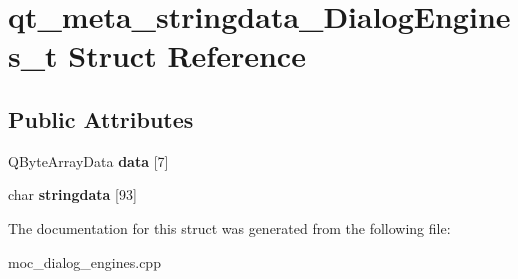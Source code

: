 \hypertarget{structqt__meta__stringdata__DialogEngines__t}{\section{qt\-\_\-meta\-\_\-stringdata\-\_\-\-Dialog\-Engines\-\_\-t Struct Reference}
\label{structqt__meta__stringdata__DialogEngines__t}
}
\subsection*{Public Attributes}
\begin{DoxyCompactItemize}
\item 
\hypertarget{structqt__meta__stringdata__DialogEngines__t_ad37b4d3d1482102aa92b3fe1529575a2}{Q\-Byte\-Array\-Data {\bfseries data} \mbox{[}7\mbox{]}}\label{structqt__meta__stringdata__DialogEngines__t_ad37b4d3d1482102aa92b3fe1529575a2}

\item 
\hypertarget{structqt__meta__stringdata__DialogEngines__t_a127378d991c894b524165910b3731c13}{char {\bfseries stringdata} \mbox{[}93\mbox{]}}\label{structqt__meta__stringdata__DialogEngines__t_a127378d991c894b524165910b3731c13}

\end{DoxyCompactItemize}


The documentation for this struct was generated from the following file\-:\begin{DoxyCompactItemize}
\item 
moc\-\_\-dialog\-\_\-engines.\-cpp\end{DoxyCompactItemize}
